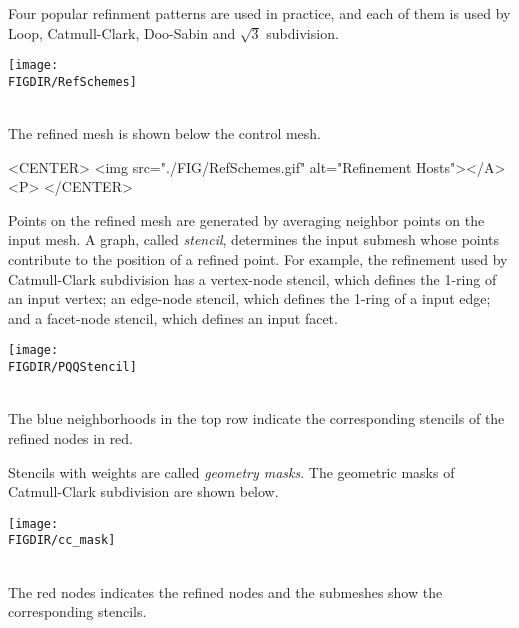 Four popular refinment patterns are used in practice, and each of them
is used by Loop, Catmull-Clark\cite{cgal:cc-rgbss-78}, Doo-Sabin 
and $\sqrt{3}$ subdivision.

\begin{ccTexOnly}
  \begin{center}
    \parbox{0.6\textwidth}{%
      \texttt{[image: \\FIGDIR/RefSchemes]}%
    }\\ \vspace{0.5cm}
    The refined mesh is shown below the control mesh.
  \end{center}
\end{ccTexOnly}

\begin{ccHtmlOnly}
  <CENTER>
     <img src="./FIG/RefSchemes.gif" alt="Refinement Hosts"></A><P>
  </CENTER>
\end{ccHtmlOnly}

Points on the refined mesh are generated by averaging
neighbor points on the input mesh. A graph, called \emph{stencil}, 
determines the input submesh whose points contribute to the 
position of a refined point. 
For example, the 
refinement used by Catmull-Clark subdivision has a vertex-node stencil, 
which defines the 1-ring of an input vertex; an edge-node stencil, 
which defines the 1-ring of a input edge; and a facet-node stencil, 
which defines an input facet.

\begin{ccTexOnly}
  \begin{center}
    \parbox{0.5\textwidth}{%
      \texttt{[image: \\FIGDIR/PQQStencil]}%
    }\\ \vspace{0.5cm}
    The blue neighborhoods in the top row indicate the corresponding
    stencils of the refined nodes in red. 
  \end{center}
\end{ccTexOnly}

Stencils with weights are called \emph{geometry masks}.
The geometric masks of Catmull-Clark subdivision are shown below.

\begin{ccTexOnly}
  \begin{center}
    \parbox{0.4\textwidth}{%
      \texttt{[image: \\FIGDIR/cc\_mask]}%
    } \\ \vspace{0.5cm}
    The red nodes indicates the refined nodes and the submeshes 
    show the corresponding stencils.
  \end{center}
\end{ccTexOnly}

